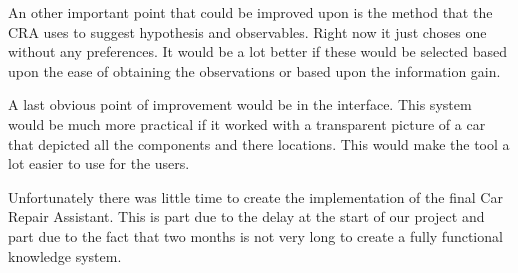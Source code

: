 \documentclass[a4paper,10pt]{article}
\begin{document}
An other important point that could be improved upon is the method that the CRA uses to suggest hypothesis and observables. Right now it just choses one without any preferences. It would be a lot better if these would be selected based upon the ease of obtaining the observations or based upon the information gain.

A last obvious point of improvement would be in the interface. This system would be much more practical if it worked with a transparent picture of a car that depicted all the components and there locations. This would make the tool a lot easier to use for the users.

Unfortunately there was little time to create the implementation of the final Car Repair Assistant. This is part due to the delay at the start of our project and part due to the fact that two months is not very long to create a fully functional knowledge system.
\end{document}
